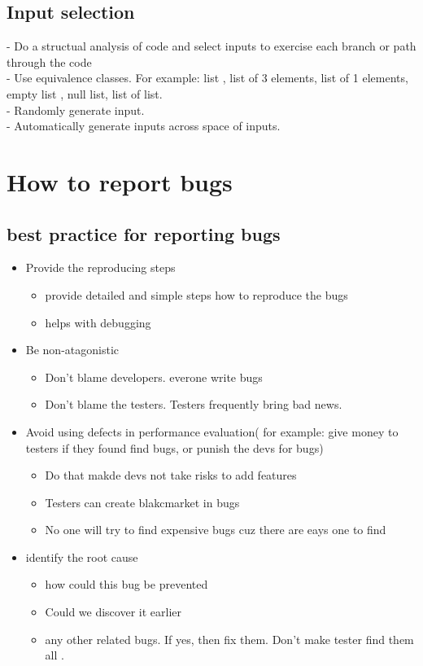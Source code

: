 \documentclass{article}
\begin{document}
   \subsection{ Input selection}
   - Do a structual analysis of code and select inputs to exercise each branch
   or path through the code \\
   - Use equivalence classes. For example: list , list of 3 elements, list of 1
   elements, empty list , null list, list of list. \\
   - Randomly generate input. \\
   - Automatically generate inputs across space of inputs. \\
  
 \section{How to report bugs}
 \subsection{best practice for reporting bugs}
 \begin{itemize}
   \item Provide the reproducing steps
   \begin{itemize}
     \item provide detailed and simple steps how to reproduce the bugs
     \item helps with debugging
   \end{itemize}
   \item Be non-atagonistic
   \begin{itemize}
     \item Don't blame developers. everone write bugs
     \item Don't blame the testers. Testers frequently bring bad news.
   \end{itemize}
   \item Avoid using defects in performance evaluation( for example: give money
   to testers if they found find bugs, or punish the devs for bugs)
   \begin{itemize}
     \item Do that makde devs not take risks to add features
     \item Testers can create blakcmarket in bugs
     \item No one will try to find expensive bugs cuz there are eays one to find
   \end{itemize}
   \item identify the root cause
   \begin{itemize}
     \item how could this bug be prevented
     \item Could we discover it earlier
     \item any other related bugs. If yes, then fix them. Don't make tester find
     them all .
   \end{itemize}
 \end{itemize}
 
\end{document}
